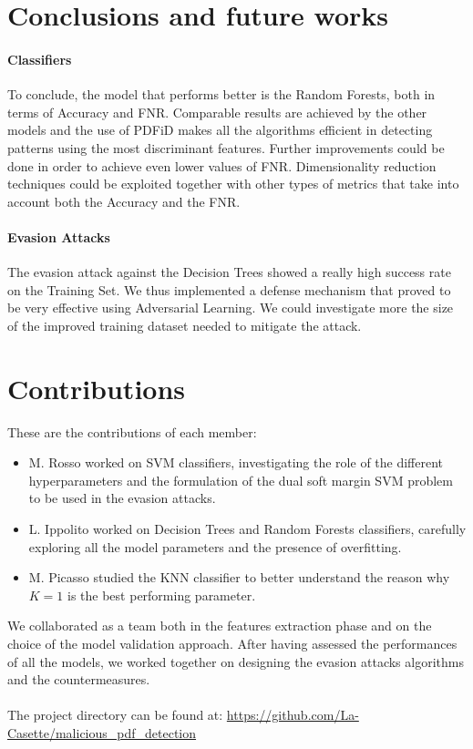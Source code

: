 \documentclass[twocolumn, switch]{article} %
\begin{document}
\section{Conclusions and future works}
\label{sec:conclusions}
\paragraph{Classifiers}
To conclude, the model that performs better is the Random Forests, both in terms of Accuracy and FNR. Comparable results are achieved by the other models and the use of PDFiD makes all the algorithms efficient in detecting patterns using the most discriminant features. Further improvements could be done in order to achieve even lower values of FNR. Dimensionality reduction techniques could be exploited together with other types of metrics that take into account both the Accuracy and the FNR.
\vspace{-5pt}
\paragraph{Evasion Attacks}
The evasion attack against the Decision Trees showed a really high success rate on the Training Set. We thus implemented a defense mechanism that proved to be very effective using Adversarial Learning. We could investigate more the size of the improved training dataset needed to mitigate the attack.
\section{Contributions}
\label{sec:contributions}
These are the contributions of each member:
\begin{itemize}
	\item M. Rosso worked on SVM classifiers, investigating the role of the different hyperparameters and the formulation of the dual soft margin SVM problem to be used in the evasion attacks.
	\item L. Ippolito worked on Decision Trees and Random Forests classifiers, carefully exploring all the model parameters and the presence of overfitting.
	\item M. Picasso studied the KNN classifier to better understand the reason why $K=1$ is the best performing parameter.
\end{itemize}
We collaborated as a team both in the features extraction phase and on the choice of the model validation approach. After having assessed the performances of all the models, we worked together on designing the evasion attacks algorithms and the countermeasures.
\\~\\
The project directory can be found at:\newline
\footnotesize{\url{https://github.com/La-Casette/malicious_pdf_detection}}
\end{document}
